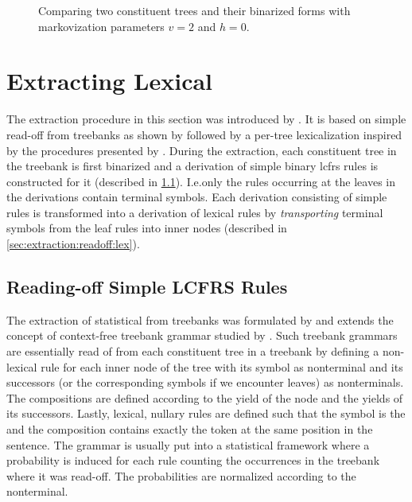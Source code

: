 \documentclass[../document.tex]{subfiles}
\begin{document}
    \begin{figure}
        \caption{\label{fig:ex:markovization}
            Comparing two constituent trees and their binarized forms with markovization parameters \(v=2\) and \(h=0\).}
    \end{figure}


    \section{Extracting Lexical } \label{sec:extraction:readoff}
    The extraction procedure in this section was introduced by \citet{RupMoe21}.
    It is based on simple  read-off from treebanks as shown by \citet{KalMai13} followed by a per-tree lexicalization inspired by the procedures presented by \citet{EngMalMan18, MoeRup20}.
    During the extraction, each constituent tree in the treebank is first binarized and a derivation of simple binary lcfrs rules is constructed for it (described in \cref{sec:extraction:readoff:simple}).
    I.e.\@ only the rules occurring at the leaves in the derivations contain terminal symbols.
    Each derivation consisting of simple  rules is transformed into a derivation of lexical rules by \emph{transporting} terminal symbols from the leaf rules into inner nodes (described in \cref{sec:extraction:readoff:lex}).

    \subsection{Reading-off Simple LCFRS Rules}\label{sec:extraction:readoff:simple}
    The extraction of statistical  from treebanks was formulated by \citet{MaierSogaard08} and extends the concept of context-free treebank grammar studied by \citet{Cha96}.
    Such treebank grammars are essentially read of from each constituent tree in a treebank by defining a non-lexical rule for each inner node of the tree with its symbol as  nonterminal and its successors (or the corresponding  symbols if we encounter leaves) as  nonterminals.
    The compositions are defined according to the yield of the node and the yields of its successors.
    Lastly, lexical, nullary rules are defined such that the  symbol is the  and the composition contains exactly the token at the same position in the sentence.
    The grammar is usually put into a statistical framework where a probability is induced for each rule counting the occurrences in the treebank where it was read-off.
    The probabilities are normalized according to the  nonterminal.
\end{document}
